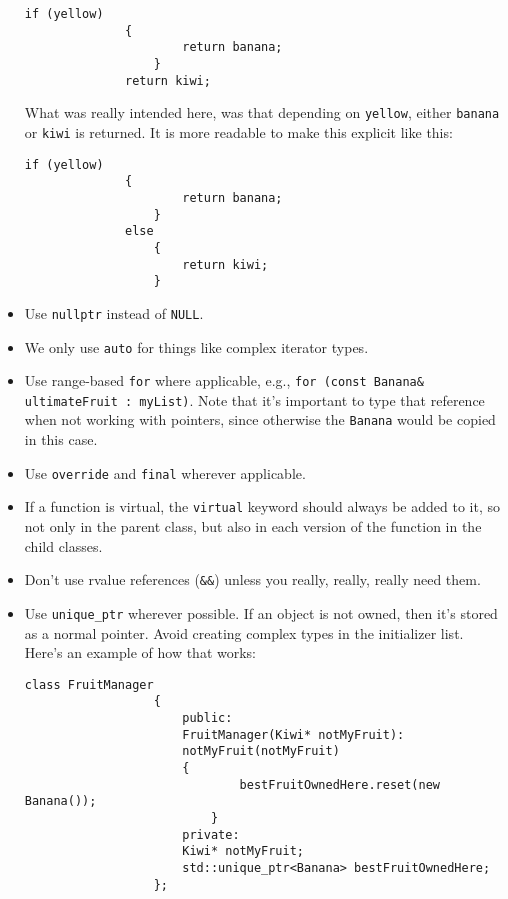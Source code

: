 \documentclass{article}
\begin{document}
\begin{itemize}
          \begin{Verbatim}[fontsize=\small]
              if (yellow)
              {
                      return banana;
                  }
              return kiwi;
          \end{Verbatim}
          What was really intended here, was that depending on \texttt{yellow}, either \texttt{banana} or \texttt{kiwi} is returned. It is more readable to make this explicit like this:
          \begin{Verbatim}[fontsize=\small]
              if (yellow)
              {
                      return banana;
                  }
              else
                  {
                      return kiwi;
                  }
          \end{Verbatim}
    \item Use \texttt{nullptr} instead of \texttt{NULL}.
    \item We only use \texttt{auto} for things like complex iterator types.
    \item Use range-based \texttt{for} where applicable, e.g., \texttt{for (const Banana\& ultimateFruit : myList)}. Note that it's important to type that reference when not working with pointers, since otherwise the \texttt{Banana} would be copied in this case.
    \item Use \texttt{override} and \texttt{final} wherever applicable.
    \item If a function is virtual, the \texttt{virtual} keyword should always be added to it, so not only in the parent class, but also in each version of the function in the child classes.
    \item Don't use rvalue references (\texttt{\&\&}) unless you really, really, really need them.
    \item Use \texttt{unique\_ptr} wherever possible. If an object is not owned, then it's stored as a normal pointer. Avoid creating complex types in the initializer list. Here's an example of how that works:
          \begin{Verbatim}[fontsize=\small]
              class FruitManager
                  {
                      public:
                      FruitManager(Kiwi* notMyFruit):
                      notMyFruit(notMyFruit)
                      {
                              bestFruitOwnedHere.reset(new Banana());
                          }
                      private:
                      Kiwi* notMyFruit;
                      std::unique_ptr<Banana> bestFruitOwnedHere;
                  };
          \end{Verbatim}

\end{itemize}
\end{document}
